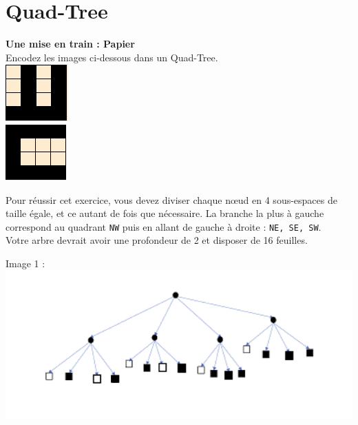 \newpage

\section{Quad-Tree}
\begin{Exercice}[10 minutes]\textbf{Une mise en train : Papier}\\

Encodez les images ci-dessous dans un Quad-Tree.\\

\includegraphics[]{Quad-Tree 1.PNG}\\
\includegraphics[]{Quad-Tree 2.PNG}

\begin{conseil}
    Pour réussir cet exercice, vous devez diviser chaque nœud en 4 sous-espaces de taille égale, et ce autant de fois que nécessaire. La branche la plus à gauche correspond au quadrant \lstinline{NW} puis en allant de gauche à droite : \lstinline{NE, SE, SW}.\\
    
    Votre arbre devrait avoir une profondeur de 2 et disposer de 16 feuilles.
\end{conseil}
\begin{solution}
Image 1 :\\
    \includegraphics[]{Quad-Tree1Solution.PNG}\\
    

\end{solution}
\end{Exercice}
